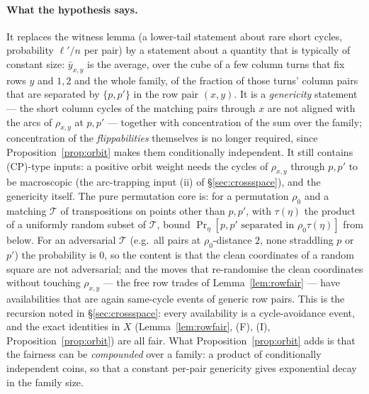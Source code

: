 \paragraph{What the hypothesis says.}  It replaces the witness
lemma (a lower-tail statement about rare short cycles, probability
$\ell'/n$ per pair) by a statement about a quantity that is
typically of constant size: $\bar y_{x,y}$ is the average, over the
cube of a few column turns that fix rows $y$ and $1,2$ and the whole
family, of the fraction of those turns' column pairs that are
separated by $\{p,p'\}$ in the row pair $(x,y)$.  It is a
\emph{genericity} statement --- the short column cycles of the
matching pairs through $x$ are not aligned with the arcs of
$\rho_{x,y}$ at $p,p'$ --- together with concentration of the sum over
the family; concentration of the \emph{flippabilities} themselves is
no longer required, since Proposition~\ref{prop:orbit} makes them
conditionally independent.  It still contains (CP)-type inputs: a
positive orbit weight needs the cycles of $\rho_{x,y}$ through $p,p'$
to be macroscopic (the arc-trapping input (ii) of
\S\ref{sec:crossspace}), and the genericity itself.  The pure
permutation core is: for a permutation $\rho_0$ and a matching
$\mathcal T$ of transpositions on points other than $p,p'$, with
$\tau(\eta)$ the product of a uniformly random subset of
$\mathcal T$, bound $\Pr_\eta[p,p'\text{ separated in }\rho_0\tau(\eta)]$
from below.  For an adversarial $\mathcal T$ (e.g.\ all pairs at
$\rho_0$-distance $2$, none straddling $p$ or $p'$) the probability is
$0$, so the content is that the clean coordinates of a random square
are not adversarial; and the
moves that re-randomise the clean coordinates without touching
$\rho_{x,y}$ --- the free row trades of Lemma~\ref{lem:rowfair} --- have
availabilities that are again same-cycle events of generic row pairs.
This is the recursion noted in \S\ref{sec:crossspace}: every
availability is a cycle-avoidance event, and the exact identities in
$X$ (Lemma~\ref{lem:rowfair}, (F), (I), Proposition~\ref{prop:orbit})
are all fair.  What Proposition~\ref{prop:orbit} adds is that the
fairness can be \emph{compounded} over a family: a product of
conditionally independent coins, so that a constant per-pair
genericity gives exponential decay in the family size.


